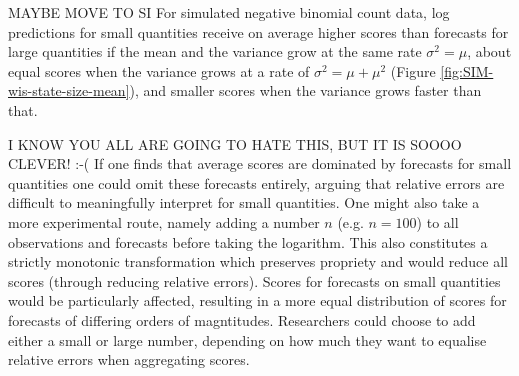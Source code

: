 \documentclass{article}
\begin{document}
MAYBE MOVE TO SI
For simulated negative binomial count data, log predictions for small quantities receive on average higher scores than forecasts for large quantities if the mean and the variance grow at the same rate $\sigma^2 = \mu$, about equal scores when the variance grows at a rate of $\sigma^2 = \mu + \mu^2$ (Figure \ref{fig:SIM-wis-state-size-mean}), and smaller scores when the variance grows faster than that. 

I KNOW YOU ALL ARE GOING TO HATE THIS, BUT IT IS SOOOO CLEVER! :-(
If one finds that average scores are dominated by forecasts for small quantities one could omit these forecasts entirely, arguing that relative errors are difficult to meaningfully interpret for small quantities. One might also take a more experimental route, namely adding a number $n$ (e.g. $n = 100$) to all observations and forecasts before taking the logarithm. This also constitutes a strictly monotonic transformation which preserves propriety and would reduce all scores (through reducing relative errors). Scores for forecasts on small quantities would be particularly affected, resulting in a more equal distribution of scores for forecasts of differing orders of magntitudes. Researchers could choose to add either a small or large number, depending on how much they want to equalise relative errors when aggregating scores. 
\end{document}
